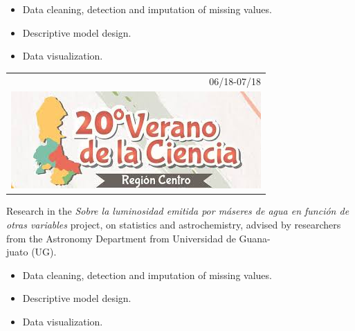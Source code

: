 \documentclass[]{friggeri-cv}
\begin{document}
\begin{entrylist}
{    \begin{itemize}
	\item Data cleaning, detection and imputation of missing values.
	\item Descriptive model design.
	\item Data visualization.
\end{itemize}}
  \entry
    {\begin{tabular}{r}
    		06/18-07/18\\
     		\includegraphics[scale=0.203]{img/20verano.jpeg}
	\end{tabular}\hspace{0.4cm}
    }
    {\vspace{-0.98cm}}
    { }
    {Research in the \textsl{Sobre la luminosidad emitida por máseres de agua en función de otras variables} project, on statistics and astrochemistry, advised by researchers from the Astronomy Department from Universidad de Guana-\\juato (UG).
    \begin{itemize}
	\item Data cleaning, detection and imputation of missing values.
	\item Descriptive model design.
	\item Data visualization.
\end{itemize}}%
\end{entrylist}
\end{document}
